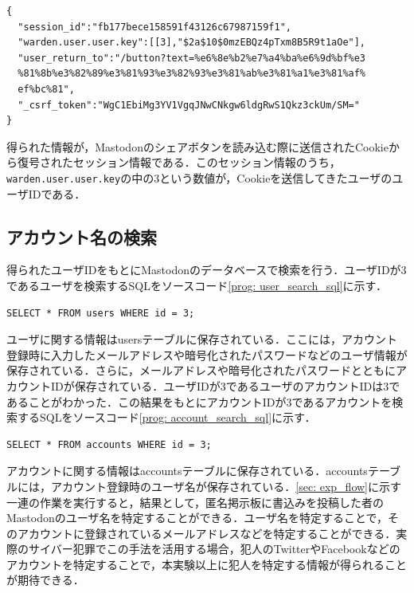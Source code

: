 \documentclass[10pt, a4paper]{jreport}
\begin{document}
\begin{verbatim}
{
  "session_id":"fb177bece158591f43126c67987159f1",
  "warden.user.user.key":[[3],"$2a$10$0mzEBQz4pTxm8B5R9t1aOe"],
  "user_return_to":"/button?text=%e6%8e%b2%e7%a4%ba%e6%9d%bf%e3
  %81%8b%e3%82%89%e3%81%93%e3%82%93%e3%81%ab%e3%81%a1%e3%81%af%
  ef%bc%81",
  "_csrf_token":"WgC1EbiMg3YV1VgqJNwCNkgw6ldgRwS1Qkz3ckUm/SM="
}
\end{verbatim}

得られた情報が，Mastodonのシェアボタンを読み込む際に送信されたCookieから復号されたセッション情報である．このセッション情報のうち，\verb|warden.user.user.key|の中の3という数値が，Cookieを送信してきたユーザのユーザIDである．

\subsection{アカウント名の検索}
得られたユーザIDをもとにMastodonのデータベースで検索を行う．ユーザIDが3であるユーザを検索するSQLをソースコード\ref{prog: user_search_sql}に示す．

\begin{lstlisting}[caption=ユーザIDが3であるユーザを検索するSQL,label=prog: user_search_sql]
SELECT * FROM users WHERE id = 3;
\end{lstlisting}

ユーザに関する情報はusersテーブルに保存されている．ここには，アカウント登録時に入力したメールアドレスや暗号化されたパスワードなどのユーザ情報が保存されている．さらに，メールアドレスや暗号化されたパスワードとともにアカウントIDが保存されている．ユーザIDが3であるユーザのアカウントIDは3であることがわかった．この結果をもとにアカウントIDが3であるアカウントを検索するSQLをソースコード\ref{prog: account_search_sql}に示す．

\begin{lstlisting}[caption=アカウントIDが3であるアカウントを検索するSQL,label=prog: account_search_sql]
SELECT * FROM accounts WHERE id = 3;
\end{lstlisting}

アカウントに関する情報はaccountsテーブルに保存されている．accountsテーブルには，アカウント登録時のユーザ名が保存されている．\ref{sec: exp_flow}に示す一連の作業を実行すると，結果として，匿名掲示板に書込みを投稿した者のMastodonのユーザ名を特定することができる．ユーザ名を特定することで，そのアカウントに登録されているメールアドレスなどを特定することができる．実際のサイバー犯罪でこの手法を活用する場合，犯人のTwitterやFacebookなどのアカウントを特定することで，本実験以上に犯人を特定する情報が得られることが期待できる．
\end{document}
